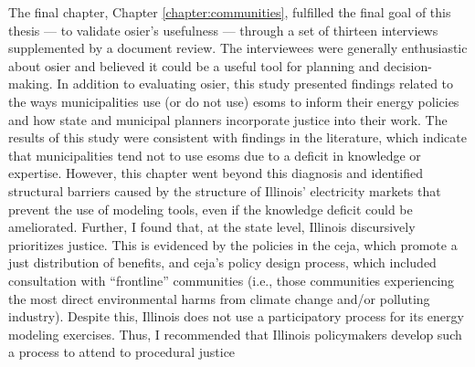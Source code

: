 The final chapter, Chapter \ref{chapter:communities}, fulfilled the final goal
of this thesis --- to validate \ac{osier}'s usefulness --- through a set of
thirteen interviews supplemented by a document review. The interviewees were
generally enthusiastic about \ac{osier} and believed it could be a useful tool
for planning and decision-making. In addition to evaluating \ac{osier}, this
study presented findings related to the ways municipalities use (or do not use)
\acp{esom} to inform their energy policies and how state and municipal planners
incorporate justice into their work. The results of this study were consistent
with findings in the literature, which indicate that municipalities tend not to
use \acp{esom} due to a deficit in knowledge or expertise. However, this chapter
went beyond this diagnosis and identified structural barriers caused by the
structure of Illinois' electricity markets that prevent the use of modeling
tools, even if the knowledge deficit could be ameliorated. Further, I found
that, at the state level, Illinois discursively prioritizes justice. This is
evidenced by the policies in the \acf{ceja}, which promote a just distribution
of benefits, and \ac{ceja}'s policy design process, which included consultation
with ``frontline'' communities (i.e., those communities experiencing the most
direct environmental harms from climate change and/or polluting industry).
Despite this, Illinois does not use a participatory process for its energy
modeling exercises. Thus, I recommended that Illinois policymakers develop such
a process to attend to procedural justice 
 
